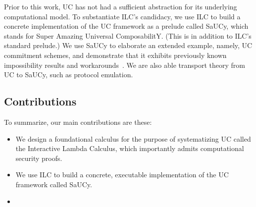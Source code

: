 Prior to this work, UC has not had a sufficient abstraction for its underlying
computational model. To substantiate ILC's candidacy, we use ILC to build a
concrete implementation of the UC framework as a prelude called SaUCy, which
stands for Super Amazing Universal ComposabilitY. (This is in addition to ILC's
standard prelude.) We use SaUCy to elaborate an extended example, namely, UC
commitment schemes, and demonstrate that it exhibits previously known
impossibility results and workarounds~\cite{canetti2001commitments}. We are also
able transport theory from UC to SaUCy, such as protocol emulation.

\subsection{Contributions}
\label{subsec:contributions}

To summarize, our main contributions are these:

\begin{itemize}[leftmargin=*]
  \item We design a foundational calculus for the purpose of systematizing UC
    called the Interactive Lambda Calculus, which importantly admits
    computational security proofs.
  \item We use ILC to build a concrete, executable implementation of the UC
    framework called SaUCy.
  \item {}
\end{itemize}
